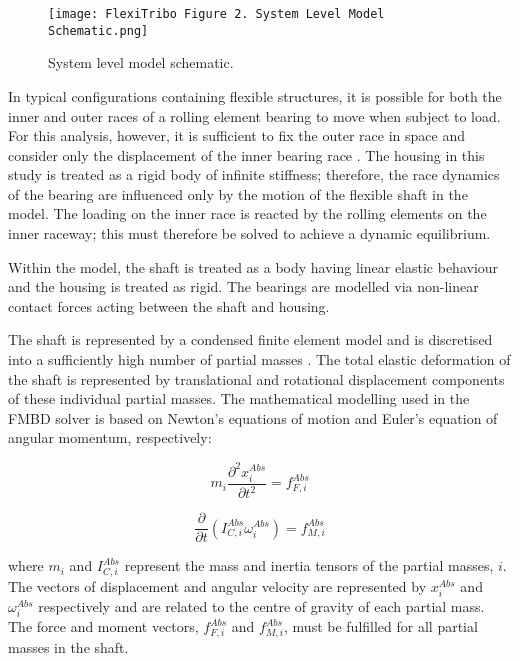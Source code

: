 \begin{figure}
	\centering  
	\texttt{[image: FlexiTribo Figure 2. System Level Model Schematic.png]}
	\caption{System level model schematic.}
	\label{System level model schematic}
\end{figure} 

In typical configurations containing flexible structures, it is possible for both the inner and outer races of a rolling element bearing to move when subject to load. For this analysis, however, it is sufficient to fix the outer race in space and consider only the displacement of the inner bearing race \cite{DeMul1989_2}. The housing in this study is treated as a rigid body of infinite stiffness; therefore, the race dynamics of the bearing are influenced only by the motion of the flexible shaft in the model. The loading on the inner race is reacted by the rolling elements on the inner raceway; this must therefore be solved to achieve a dynamic equilibrium.

Within the model, the shaft is treated as a body having linear elastic behaviour and the housing is treated as rigid. The bearings are modelled via non-linear contact forces acting between the shaft and housing.

The shaft is represented by a condensed finite element model and is discretised into a sufficiently high number of partial masses \cite{Parikyan2001}. The total elastic deformation of the shaft is represented by translational and rotational displacement components of these individual partial masses. The mathematical modelling used in the FMBD solver is based on Newton’s equations of motion and Euler’s equation of angular momentum, respectively:

\begin{equation}\label{NewtonFMBD}
	m_i \frac{\partial^2 x_i^{A b s}}{\partial t^2}=f_{F, i}^{A b s}
\end{equation}

\begin{equation}\label{EulerFMBD}
	\frac{\partial}{\partial t}\left(I_{C, i}^{A b s} \omega_i^{A b s}\right)=f_{M, i}^{A b s}
\end{equation}

where $m_i$ and $I_{C, i}^{A b s}$ represent the mass and inertia tensors of the partial masses, $i$. The vectors of displacement and angular velocity are represented by $x_i^{A b s}$ and $\omega_i^{A b s}$ respectively and are related to the centre of gravity of each partial mass. The force and moment vectors, $f_{F, i}^{A b s}$ and $f_{M, i}^{A b s}$, must be fulfilled for all partial masses in the shaft.

